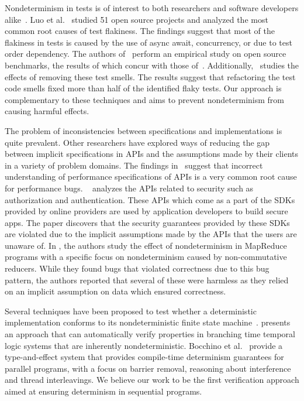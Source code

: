 Nondeterminism in tests is of interest to both
researchers and software developers alike~\cite{Fowler,Sudarshan}.
Luo et al.~\cite{LuoHEM2014} studied 51 open source projects and analyzed the most common root causes of
test flakiness. The findings suggest that most of the flakiness in tests is caused by
the use of async await, concurrency, or due to test order dependency. The authors of~\cite{Plotkin:1993:LPP:645891.671433}
perform an empirical study on open source benchmarks, the results of which concur with those of~\cite{LuoHEM2014}.
Additionally,~\cite{Plotkin:1993:LPP:645891.671433} studies the effects of removing these test smells. The results suggest that
refactoring the test code smells fixed more than half of the identified flaky tests. Our approach is complementary to
these techniques and aims to prevent nondeterminism from causing harmful effects. 


The problem of inconsistencies between specifications and implementations
is quite prevalent. Other researchers have explored ways of reducing the gap between implicit
specifications in APIs and the assumptions made by their clients in a variety of problem domains.
The findings in~\cite{Jin:2012:UDR:2254064.2254075} suggest that incorrect understanding of performance specifications of 
APIs is a very common root cause for
performance bugs. ~\cite{Rui:2013:180377} analyzes the APIs related to security such as authorization and authentication.
These APIs which come as a part of the SDKs provided by online providers are used by application developers to 
build secure apps. The paper discovers that the security guarantees provided by these SDKs are violated due to
the implicit assumptions made by the APIs that the users are unaware of. In \cite{Xiao:2014:NMC:2591062.2591177},
the authors
study the effect of nondeterminism in MapReduce programs with a specific focus on nondeterminism caused by
non-commutative reducers. While they found bugs that violated correctness due to this bug pattern,
the authors reported that several of these were harmless as they relied on an implicit assumption on data
which ensured correctness. 

Several techniques have been proposed to test whether a
deterministic implementation conforms to its nondeterministic finite state machine~\cite{Petrenko1996,Petrenko:1993:NSM:648128.761244,Savor:1997:639710,Hierons:2004:TCD:1040993.1040998}.
\cite{Cook:2013:RNP:2491956.2491969} presents an approach that can automatically verify properties
in branching time temporal logic systems that are inherently
nondeterministic.
Bocchino et
al.~\cite{Bocchino:2009:TES:1640089.1640097,Bocchino:2011:SND:1926385.1926447}
provide a type-and-effect system that provides compile-time determinism
guarantees for parallel programs, with a focus on barrier removal,
reasoning about interference and thread interleavings.
We believe our work to be the first verification approach
aimed at ensuring determinism in sequential programs.

